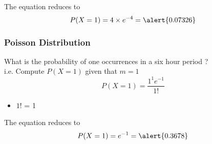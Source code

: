 {The equation reduces to
\[ P(X = 1)=4 \times e^{-4} = \alert{0.07326} \]

\frametitle{Poisson Distribution}
What is the probability of one occurrences in a six hour period ? \\ i.e. Compute $P(X=1)$ given that $m=1$
\Large
\[ P(X = 1)=\frac{1^1 e^{-1}}{1!} \]
\normalsize
\begin{itemize}

\item $1!$ = 1
\end{itemize}
The equation reduces to
\[ P(X = 1) = e^{-1} = \alert{0.3678}\]

%

}
